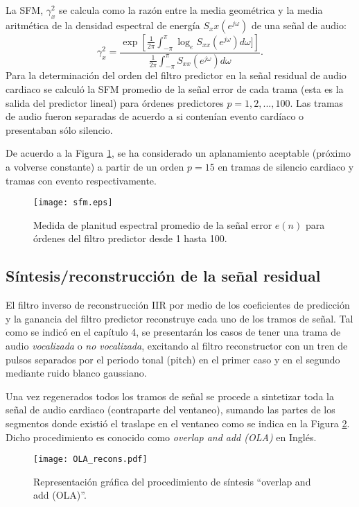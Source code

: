  La SFM, $\gamma_{x}^{2}$ se calcula como la razón entre la media geométrica y la media aritmética de la densidad espectral de energía $S_xx(e^{j\omega})$ de una señal de audio:
 \begin{equation}
 	\gamma_{x}^2 = \frac{\exp\left[\frac{1}{2\pi} \int_{-\pi}^{\pi}\log_{e}S_{xx}(e^{j\omega})d\omega]\right]}{\frac{1}{2\pi}\int_{-\pi}^{\pi}S_{xx}(e^{j\omega})d\omega}.
 \end{equation}
Para la determinación del orden del filtro predictor en la señal residual de audio cardiaco se calculó la SFM promedio de la señal error de cada trama (esta es la salida del predictor lineal) para órdenes predictores $p=1,2,...,100$. Las tramas de audio fueron separadas de acuerdo a si contenían evento cardíaco o presentaban sólo silencio.

De acuerdo a la Figura \ref{sfm}, se ha considerado un aplanamiento aceptable (próximo a volverse constante) a partir de un orden $p=15$ en tramas de silencio cardiaco y tramas con evento respectivamente. 
\begin{figure}[ht]
  \centering
  \texttt{[image: sfm.eps]}
  \caption{Medida de planitud espectral promedio de la señal error $e(n)$ para órdenes del filtro predictor desde 1 hasta 100.}
  \label{sfm}
\end{figure}
 \subsection{Síntesis/reconstrucción de la señal residual}
 El filtro inverso de reconstrucción IIR por medio de los coeficientes de predicción y la ganancia del filtro predictor reconstruye cada uno de los tramos de señal. Tal como se indicó en el capítulo 4, se presentarán los casos de tener una trama de audio \emph{vocalizada} o \emph{no vocalizada}, excitando al filtro reconstructor con un tren de pulsos separados por el periodo tonal (pitch) en el primer caso y en el segundo mediante ruido blanco gaussiano. 
 
 Una vez regenerados todos los tramos de señal se procede a sintetizar toda la señal de audio cardiaco (contraparte del ventaneo), sumando las partes de los segmentos donde existió el traslape en el ventaneo como se indica en la Figura \ref{OLArecons}. Dicho procedimiento es conocido como \emph{overlap and add (OLA)} en Inglés. 
\begin{figure}[ht]
  \centering
  \texttt{[image: OLA\_recons.pdf]}
  \caption{Representación gráfica del procedimiento de síntesis ``overlap and add (OLA)''.}
  \label{OLArecons}
\end{figure}
